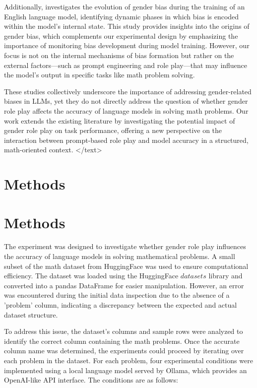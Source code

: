 \documentclass{article}
\begin{document}
Additionally, \cite{2207.10245v1} investigates the evolution of gender bias during the training of an English language model, identifying dynamic phases in which bias is encoded within the model's internal state. This study provides insights into the origins of gender bias, which complements our experimental design by emphasizing the importance of monitoring bias development during model training. However, our focus is not on the internal mechanisms of bias formation but rather on the external factors—such as prompt engineering and role play—that may influence the model's output in specific tasks like math problem solving.

These studies collectively underscore the importance of addressing gender-related biases in LLMs, yet they do not directly address the question of whether gender role play affects the accuracy of language models in solving math problems. Our work extends the existing literature by investigating the potential impact of gender role play on task performance, offering a new perspective on the interaction between prompt-based role play and model accuracy in a structured, math-oriented context.
</text>
\section{Methods}
\section{Methods}

The experiment was designed to investigate whether gender role play influences the accuracy of language models in solving mathematical problems. A small subset of the math dataset from HuggingFace was used to ensure computational efficiency. The dataset was loaded using the HuggingFace $ datasets $ library and converted into a pandas DataFrame for easier manipulation. However, an error was encountered during the initial data inspection due to the absence of a 'problem' column, indicating a discrepancy between the expected and actual dataset structure.

To address this issue, the dataset's columns and sample rows were analyzed to identify the correct column containing the math problems. Once the accurate column name was determined, the experiments could proceed by iterating over each problem in the dataset. For each problem, four experimental conditions were implemented using a local language model served by Ollama, which provides an OpenAI-like API interface. The conditions are as follows:
\end{document}
